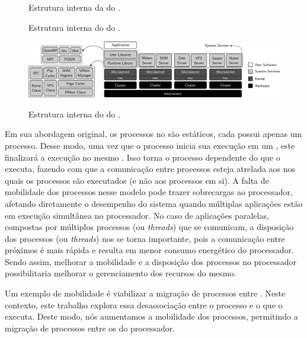 \begin{figure}[bt]
    \centering
    \caption{Estrutura interna da \hal do \nanvix.}
    
    \label{fig.hal-overview}
\end{figure}

\begin{figure}[bt]
    \centering
    \caption{Estrutura interna do \microkernel do \nanvix.}
    
    \label{fig.microkernel-overview}
\end{figure}

\begin{figure}[bt]
    \centering
    \caption{Estrutura interna do \multikernel do \nanvix.}
    \includegraphics[width=0.9\linewidth]{content/images/multikernel.png}
    \label{fig.multikernel-overview}
\end{figure}


Em sua abordagem original, os processos no \nanvix são estáticos, \ie cada \cluster possui apenas um processo. Desse modo, uma vez que o processo inicia sua execução em um \cluster, este finalizará a execução no mesmo \cluster. 
Isso torna o processo dependente do \cluster que o executa, fazendo com que a comunicação entre processos esteja atrelada aos \clusters nos quais os processos são executados (e não aos processos em si). A falta de mobilidade dos processos nesse modelo pode trazer sobrecargas ao processador, afetando diretamente o desempenho do sistema quando múltiplas aplicações estão em execução simultânea no processador. No caso de aplicações paralelas, compostas por múltiplos processos (ou \textit{threads}) que se comunicam, a disposição dos processos (ou \textit{threads}) nos \clusters se torna importante, pois a comunicação entre \clusters próximos é mais rápida e resulta em menor consumo energético do processador. Sendo assim, melhorar a mobilidade e a disposição dos processos no processador possibilitaria melhorar o gerenciamento dos recursos do mesmo. 

Um exemplo de mobilidade é viabilizar a migração de processos entre \clusters. Neste contexto, este trabalho explora essa desassociação entre o processo e o \cluster que o executa. Deste modo, nós aumentamos a mobilidade dos processos, permitindo a migração de processos entre os \clusters do processador.

